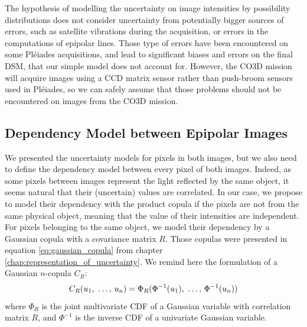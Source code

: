 \begin{remark}
    The hypothesis of modelling the uncertainty on image intensities by possibility distributions does not consider uncertainty from potentially bigger sources of errors, such as satellite vibrations during the acquisition, or errors in the computations of epipolar lines. Those type of errors have been encountered on some Pléiades acquisitions, and lead to significant biases and errors on the final DSM, that our simple model does not account for. However, the CO3D mission will acquire images using a CCD matrix sensor rather than push-broom sensors used in Pléiades, so we can safely assume that those problems should not be encountered on images from the CO3D mission.
\end{remark}

\subsection{Dependency Model between Epipolar Images}
We presented the uncertainty models for pixels in both images, but we also need to define the dependency model between every pixel of both images. Indeed, as some pixels between images represent the light reflected by the same object, it seems natural that their (uncertain) values are correlated. In our case, we propose to model their dependency with the product copula if the pixels are not from the same physical object, meaning that the value of their intensities are independent. For pixels belonging to the same object, we model their dependency by a Gaussian copula with a covariance matrix $R$. Those copulas were presented in equation \eqref{eq:gaussian_copula} from chapter \ref{chap:representation_of_uncertainty}. We remind here the formulation of a Gaussian $n$-copula $C_R$:
\begin{align}
    C_R(u_1 {, ~\dots, ~} u_n)=\Phi_R(\Phi^{-1}(u_1) {, ~\dots, ~} \Phi^{-1}(u_n))\label{eq:gaussian_copula}
\end{align} where $\Phi_R$ is the joint multivariate CDF of a Gaussian variable with correlation matrix $R$, and $\Phi^{-1}$ is the inverse CDF of a univariate Gaussian variable.

